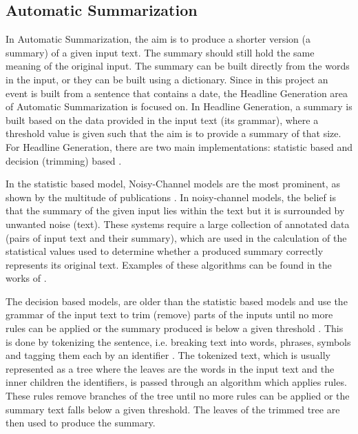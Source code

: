 \subsection{Automatic Summarization}
\par In Automatic Summarization, the aim is to produce a shorter version (a summary) of a given input text. The summary should still hold the same meaning of the original input. The summary can be built directly from the words in the input, or they can be built using a dictionary. Since in this project an event is built from a sentence that contains a date, the Headline Generation area of Automatic Summarization is focused on. In Headline Generation, a summary is built based on the data provided in the input text (its grammar), where a threshold value is given such that the aim is to provide a summary of that size. For Headline Generation, there are two main implementations: statistic based and decision (trimming) based \cite{daumemarcu2002}.
\par In the statistic based model, Noisy-Channel models are the most prominent, as shown by the multitude of publications \cite{daumemarcu2002,rushchopraweston2015,chopraaulirush2016}. In noisy-channel models, the belief is that the summary of the given input lies within the text but it is surrounded by unwanted noise (text). These systems require a large collection of annotated data (pairs of input text and their summary), which are used in the calculation of the statistical values used to determine whether a produced summary correctly represents its original text. Examples of these algorithms can be found in the works of \cite{daumemarcu2002,knightmarcu2000}.
\par The decision based models, are older than the statistic based models and use the grammar of the input text to trim (remove) parts of the inputs until no more rules can be applied or the summary produced is below a given threshold \cite{dorrzajicschwartz2003}. This is done by tokenizing the sentence, i.e. breaking text into words, phrases, symbols and tagging them each by an identifier \cite{tokenize}. The tokenized text, which is usually represented as a tree where the leaves are the words in the input text and the inner children the identifiers, is passed through an algorithm which applies rules. These rules remove branches of the tree until no more rules can be applied or the summary text falls below a given threshold. The leaves of the trimmed tree are then used to produce the summary.

